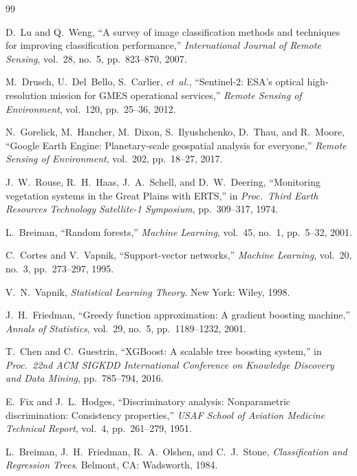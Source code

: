 \documentclass[12pt, a4paper, twocolumn]{article}
\begin{document}
\begin{thebibliography}{99}

D.~Lu and Q.~Weng, ``A survey of image classification methods and techniques for improving classification performance,'' \textit{International Journal of Remote Sensing}, vol.~28, no.~5, pp.~823--870, 2007.

M.~Drusch, U.~Del~Bello, S.~Carlier, \textit{et~al.}, ``Sentinel-2: ESA's optical high-resolution mission for GMES operational services,'' \textit{Remote Sensing of Environment}, vol.~120, pp.~25--36, 2012.

N.~Gorelick, M.~Hancher, M.~Dixon, S.~Ilyushchenko, D.~Thau, and R.~Moore, ``Google Earth Engine: Planetary-scale geospatial analysis for everyone,'' \textit{Remote Sensing of Environment}, vol.~202, pp.~18--27, 2017.

J.~W.~Rouse, R.~H.~Haas, J.~A.~Schell, and D.~W.~Deering, ``Monitoring vegetation systems in the Great Plains with ERTS,'' in \textit{Proc.\ Third Earth Resources Technology Satellite-1 Symposium}, pp.~309--317, 1974.

L.~Breiman, ``Random forests,'' \textit{Machine Learning}, vol.~45, no.~1, pp.~5--32, 2001.

C.~Cortes and V.~Vapnik, 
``Support-vector networks,'' \textit{Machine Learning}, vol.~20, no.~3, pp.~273--297, 1995.

V.~N.~Vapnik, \textit{Statistical Learning Theory}.
New York: Wiley, 1998.

J.~H.~Friedman, ``Greedy function approximation: A gradient boosting machine,'' \textit{Annals of Statistics}, vol.~29, no.~5, pp.~1189--1232, 2001.

T.~Chen and C.~Guestrin, ``XGBoost: A scalable tree boosting system,'' in \textit{Proc.\ 22nd ACM SIGKDD International Conference on Knowledge Discovery and Data Mining}, pp.~785--794, 2016.

E.~Fix and J.~L.~Hodges, ``Discriminatory analysis: Nonparametric discrimination: Consistency properties,'' \textit{USAF School of Aviation Medicine Technical Report}, vol.~4, pp.~261--279, 1951.

L.~Breiman, J.~H.~Friedman, R.~A.~Olshen, and C.~J.~Stone, \textit{Classification and Regression Trees}.
Belmont, CA: Wadsworth, 1984.

\end{thebibliography}
\end{document}
